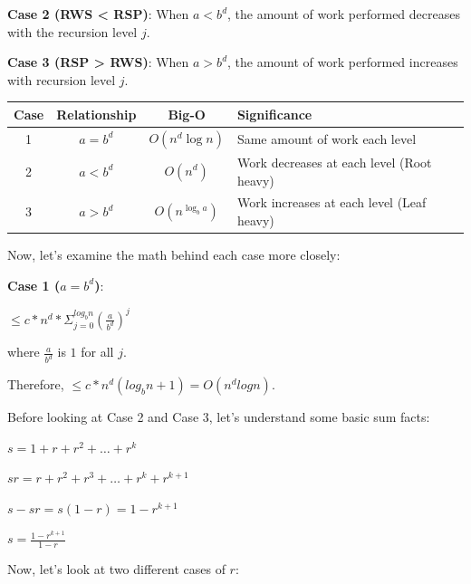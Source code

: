 \documentclass[11pt]{article}
\begin{document}
\textbf{Case 2 (RWS < RSP)}: When $a < b^d$, the amount of work performed decreases with the recursion level $j$.

\vspace{11pt}
\textbf{Case 3 (RSP > RWS)}: When $a > b^d$, the amount of work performed increases with recursion level $j$.

\newpage

\begin{center}
\begin{tabular}{|c|c|c|l|}
    \hline
    Case & Relationship & Big-O & Significance \\ \hline
    1 & $a=b^d$ & $O(n^d \log n)$ & Same amount of work each level \\ \hline
    2 & $a < b^d$ & $O(n^d)$ & Work decreases at each level (Root heavy) \\ \hline
    3 & $a > b^d$ & $O(n^{\log_b a})$ & Work increases at each level (Leaf heavy) \\ \hline
\end{tabular}
\end{center}
\vspace{11pt}

Now, let's examine the math behind each case more closely:

\vspace{11pt}
\textbf{Case 1 ($a=b^d$)}:

\vspace{11pt}
\begin{center}
    $\leq c*n^d *\Sigma_{j=0}^{log_bn}(\frac{a}{b^d})^j$

    where $\frac{a}{b^d}$ is $1$ for all $j$.

    Therefore, $\leq c *n^d(log_bn+1) = O(n^dlogn)$.
\end{center}
\vspace{11pt}

Before looking at Case 2 and Case 3, let's understand some basic sum facts:

\vspace{11pt}
\begin{center}
    $s = 1 + r+r^2+ \dots + r^k$

    $sr = r + r^2 + r^3 + \dots + r^k + r^{k+1}$

    $s-sr = s(1-r)=1-r^{k+1}$
    
    $s = \frac{1-r^{k+1}}{1-r}$
\end{center}
\vspace{11pt}

Now, let's look at two different cases of $r$:
\vspace{11pt}
\end{document}
